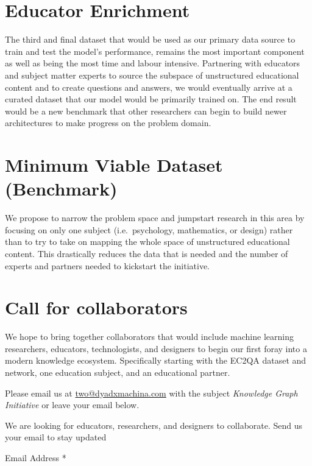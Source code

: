 \documentclass{acm_proc_article-sp}
\begin{document}
\section{Educator Enrichment}\label{educator-enrichment}

The third and final dataset that would be used as our primary data
source to train and test the model's performance, remains the most
important component as well as being the most time and labour intensive.
Partnering with educators and subject matter experts to source the
subspace of unstructured educational content and to create questions and
answers, we would eventually arrive at a curated dataset that our model
would be primarily trained on. The end result would be a new benchmark
that other researchers can begin to build newer architectures to make
progress on the problem domain.

\section{Minimum Viable Dataset
(Benchmark)}\label{minimum-viable-dataset-benchmark}

We propose to narrow the problem space and jumpstart research in this
area by focusing on only one subject (i.e.~psychology, mathematics, or
design) rather than to try to take on mapping the whole space of
unstructured educational content. This drastically reduces the data that
is needed and the number of experts and partners needed to kickstart the
initiative.

\section{Call for collaborators}\label{call-for-collaborators}

We hope to bring together collaborators that would include machine
learning researchers, educators, technologists, and designers to begin
our first foray into a modern knowledge ecosystem. Specifically starting
with the EC2QA dataset and network, one education subject, and an
educational partner.

Please email us at \url{two@dyadxmachina.com} with the subject
\emph{Knowledge Graph Initiative} or leave your email below.

\hypertarget{mc_embed_signup}{}
\hypertarget{mc_embed_signup_scroll}{}
We are looking for educators, researchers, and designers to collaborate.
Send us your email to stay updated

Email Address *
\end{document}
